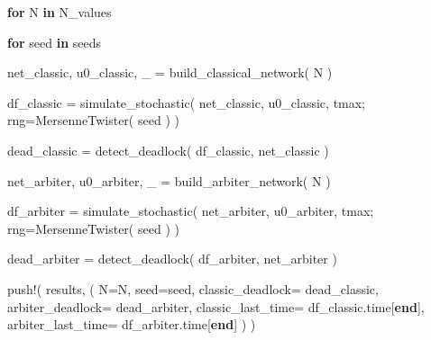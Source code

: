 \documentclass[
  english,
  russian,
  12pt,
  a4paper,
  DIV=11,
  numbers=noendperiod]{scrreprt}
\newenvironment{Shaded}{\begin{snugshade}}{\end{snugshade}}
\newcommand{\ControlFlowTok}[1]{\textcolor[rgb]{0.00,0.23,0.31}{\textbf{#1}}}
\newcommand{\FunctionTok}[1]{\textcolor[rgb]{0.28,0.35,0.67}{#1}}
\newcommand{\KeywordTok}[1]{\textcolor[rgb]{0.00,0.23,0.31}{\textbf{#1}}}
\newcommand{\NormalTok}[1]{\textcolor[rgb]{0.00,0.23,0.31}{#1}}
\newcommand{\OperatorTok}[1]{\textcolor[rgb]{0.37,0.37,0.37}{#1}}
\begin{document}
\begin{Shaded}
\begin{Highlighting}[]
\ControlFlowTok{for}\NormalTok{ N }\KeywordTok{in}\NormalTok{ N\_values}

    \ControlFlowTok{for}\NormalTok{ seed }\KeywordTok{in}\NormalTok{ seeds}

\NormalTok{        net\_classic,}
\NormalTok{        u0\_classic,}
\NormalTok{        \_ }\OperatorTok{=}
            \FunctionTok{build\_classical\_network}\NormalTok{(}
\NormalTok{                N}
\NormalTok{            )}

\NormalTok{        df\_classic }\OperatorTok{=}
            \FunctionTok{simulate\_stochastic}\NormalTok{(}
\NormalTok{                net\_classic,}
\NormalTok{                u0\_classic,}
\NormalTok{                tmax;}
\NormalTok{                rng}\OperatorTok{=}\FunctionTok{MersenneTwister}\NormalTok{(}
\NormalTok{                    seed}
\NormalTok{                )}
\NormalTok{            )}

\NormalTok{        dead\_classic }\OperatorTok{=}
            \FunctionTok{detect\_deadlock}\NormalTok{(}
\NormalTok{                df\_classic,}
\NormalTok{                net\_classic}
\NormalTok{            )}

\NormalTok{        net\_arbiter,}
\NormalTok{        u0\_arbiter,}
\NormalTok{        \_ }\OperatorTok{=}
            \FunctionTok{build\_arbiter\_network}\NormalTok{(}
\NormalTok{                N}
\NormalTok{            )}

\NormalTok{        df\_arbiter }\OperatorTok{=}
            \FunctionTok{simulate\_stochastic}\NormalTok{(}
\NormalTok{                net\_arbiter,}
\NormalTok{                u0\_arbiter,}
\NormalTok{                tmax;}
\NormalTok{                rng}\OperatorTok{=}\FunctionTok{MersenneTwister}\NormalTok{(}
\NormalTok{                    seed}
\NormalTok{                )}
\NormalTok{            )}

\NormalTok{        dead\_arbiter }\OperatorTok{=}
            \FunctionTok{detect\_deadlock}\NormalTok{(}
\NormalTok{                df\_arbiter,}
\NormalTok{                net\_arbiter}
\NormalTok{            )}

        \FunctionTok{push!}\NormalTok{(}
\NormalTok{            results,}
\NormalTok{            (}
\NormalTok{                N}\OperatorTok{=}\NormalTok{N,}
\NormalTok{                seed}\OperatorTok{=}\NormalTok{seed,}
\NormalTok{                classic\_deadlock}\OperatorTok{=}
\NormalTok{                    dead\_classic,}
\NormalTok{                arbiter\_deadlock}\OperatorTok{=}
\NormalTok{                    dead\_arbiter,}
\NormalTok{                classic\_last\_time}\OperatorTok{=}
\NormalTok{                    df\_classic.time[}\KeywordTok{end}\NormalTok{],}
\NormalTok{                arbiter\_last\_time}\OperatorTok{=}
\NormalTok{                    df\_arbiter.time[}\KeywordTok{end}\NormalTok{]}
\NormalTok{            )}
\NormalTok{        )}


\end{Highlighting}
\end{Shaded}
\end{document}
